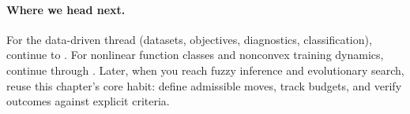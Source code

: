 \medskip
\paragraph{Where we head next.} For the data-driven thread (datasets, objectives, diagnostics, classification), continue to . For nonlinear function classes and nonconvex training dynamics, continue through . Later, when you reach fuzzy inference and evolutionary search, reuse this chapter's core habit: define admissible moves, track budgets, and verify outcomes against explicit criteria.

